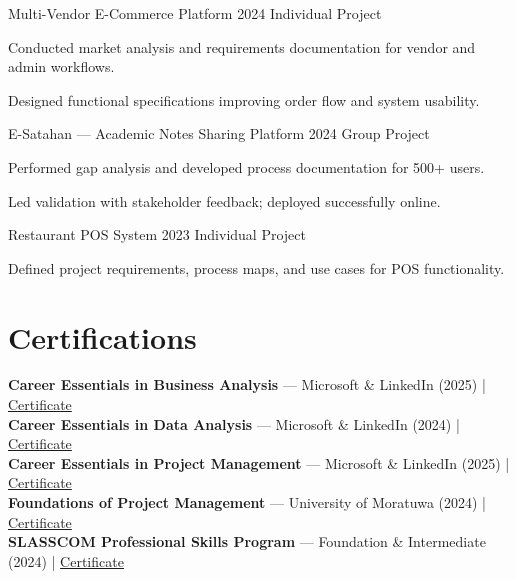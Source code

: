\documentclass[letterpaper,12pt]{article}
\begin{document}
\vspace{6pt}
{Multi-Vendor E-Commerce Platform}
{2024}
{Individual Project}{
  \item Conducted market analysis and requirements documentation for vendor and admin workflows.
  \item Designed functional specifications improving order flow and system usability.
}
\newpage
\vspace{6pt}
{E-Satahan — Academic Notes Sharing Platform}
{2024}
{Group Project}{
  \item Performed gap analysis and developed process documentation for 500+ users.
  \item Led validation with stakeholder feedback; deployed successfully online.
}

\vspace{6pt}
{Restaurant POS System}
{2023}
{Individual Project}
{
  \item Defined project requirements, process maps, and use cases for POS functionality.
}


\section{Certifications}
\vspace{-1pt}

\textbf{Career Essentials in Business Analysis} — Microsoft \& LinkedIn (2025) | \href{https://www.linkedin.com/posts/vindya-kodithuwakku-bb6187202_businessanalysis-careeressentials-microsoft-activity-7371193871919398914-PKak}{Certificate}\\[3pt]
\textbf{Career Essentials in Data Analysis} — Microsoft \& LinkedIn (2024) | \href{https://www.linkedin.com/posts/vindya-kodithuwakku-bb6187202_dataanalysis-careeressentials-microsoft-activity-7379124237950750720-kKmD}{Certificate}\\[3pt]
\textbf{Career Essentials in Project Management} — Microsoft \& LinkedIn (2025) | \href{https://www.linkedin.com/posts/vindya-kodithuwakku-bb6187202_projectmanagement-careeressentials-microsoft-activity-7374470702059438080-zbfj}{Certificate}\\[3pt]
\textbf{Foundations of Project Management} — University of Moratuwa (2024) | \href{https://open.uom.lk/lms/mod/customcert/verify_certificate.php?code=ATuxOYBBAE&qrcode=1}{Certificate}\\[3pt]
\textbf{SLASSCOM Professional Skills Program} — Foundation \& Intermediate (2024) | \href{https://www.linkedin.com/posts/vindya-kodithuwakku-bb6187202_slasscom-professionalskillsprogram-careerdevelopment-activity-7379038487246860288-PRA0}{Certificate}
\end{document}
